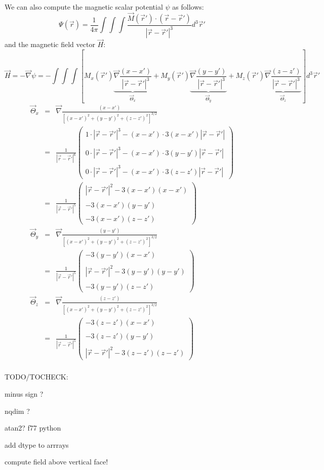 We can also compute the magnetic scalar potential $\psi$ as follows:
\[
\Psi (\vec r)= \frac{1}{4\pi} \int\int\int \frac{{\vec M}({\vec r}') \cdot ({\vec r}-{\vec r}')}{|{\vec r}-{\vec r}'|^3} 
d^3{\vec r}'
\]
and the magnetic field vector $\vec H$:
\[
\vec H = -\vec\nabla \psi = 
- \int\int\int 
\left[
 M_x({\vec r}') \underbrace{\vec\nabla \frac{ (x-x')}{|{\vec r}-{\vec r}'|^3}}_{\vec\Theta_x} +   
 M_y({\vec r}') \underbrace{\vec\nabla \frac{ (y-y')}{|{\vec r}-{\vec r}'|^3}}_{\vec\Theta_y} +   
 M_z({\vec r}') \underbrace{\vec\nabla \frac{ (z-z')}{|{\vec r}-{\vec r}'|^3}}_{\vec\Theta_z}    
\right] 
d^3{\vec r}'
\]
\begin{eqnarray}
\vec\Theta_x 
&=& \vec\nabla \frac{ (x-x')}{ [(x-x')^2+(y-y')^2+(z-z')^2]^{3/2}   } \\
&=&
\frac{1}{|{\vec r}-{\vec r}'|^6}
\left(\begin{array}{c}
1 \cdot |{\vec r}-{\vec r}'|^3 - (x-x') \cdot 3 (x-x') |{\vec r}-{\vec r}'| \\ \\
0 \cdot |{\vec r}-{\vec r}'|^3 - (x-x') \cdot 3 (y-y') |{\vec r}-{\vec r}'| \\ \\
0 \cdot |{\vec r}-{\vec r}'|^3 - (x-x') \cdot 3 (z-z') |{\vec r}-{\vec r}'| 
\end{array}\right) \\
&=& 
\frac{1}{|{\vec r}-{\vec r}'|^5}
\left(\begin{array}{c}
|{\vec r}-{\vec r}'|^2 - 3(x-x') (x-x')  \\ \\
- 3(x-x')(y-y')  \\ \\
- 3(x-x')(z-z')  
\end{array}\right) \\ 
\vec\Theta_y 
&=& \vec\nabla \frac{ (y-y')}{ [(x-x')^2+(y-y')^2+(z-z')^2]^{3/2}   } \\
&=& 
\frac{1}{|{\vec r}-{\vec r}'|^5}
\left(\begin{array}{c}
- 3(y-y') (x-x')  \\ \\
|{\vec r}-{\vec r}'|^2 - 3(y-y')(y-y')  \\ \\
- 3(y-y')(z-z')  
\end{array}\right) \\ 
\vec\Theta_z 
&=& \vec\nabla \frac{ (z-z')}{ [(x-x')^2+(y-y')^2+(z-z')^2]^{3/2}   } \\
&=& 
\frac{1}{|{\vec r}-{\vec r}'|^5}
\left(\begin{array}{c}
- 3(z-z') (x-x')  \\ \\
- 3(z-z')(y-y')  \\ \\
|{\vec r}-{\vec r}'|^2 - 3(z-z')(z-z')  
\end{array}\right) \\ 
\end{eqnarray}





TODO/TOCHECK:

minus sign ?

nqdim ? 

atan2? f77 python 

add dtype to arrrays

compute field above vertical face!
